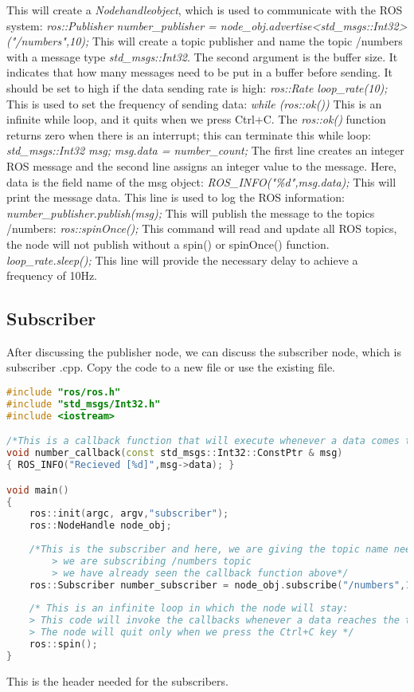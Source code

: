  This will create a \textit{Nodehandleobject}, which is used to communicate with the ROS system:
 \textit{ ros::Publisher number\_publisher = node\_obj.advertise<std\_msgs::Int32>("/numbers",10);} 
 This will create a topic publisher and name the topic /numbers with a message type \textit{std\_msgs::Int32}. The second argument is the buffer size. It indicates that how many messages need to be put in a buffer before sending. It should be set to high if the data sending rate is high: \textit{ros::Rate loop\_rate(10);} This is used to set the frequency of sending data:\textit{ while (ros::ok()) } This is an infinite while loop, and it quits when we press Ctrl+C. The\textit{ ros::ok()} function returns zero when there is an interrupt; this can terminate this while loop:
 \textit{std\_msgs::Int32 msg;} 
 \textit{msg.data = number\_count;} 
 The first line creates an integer ROS message and the second line assigns an integer value to the message.
 Here, data is the field name of the msg object:\textit{ ROS\_INFO("\%d",msg.data);} This will print the message data. This line is used to log the ROS information: \textit{number\_publisher.publish(msg);}
 This will publish the message to the topics /numbers:\textit{ ros::spinOnce();} 
 This command will read and update all ROS topics, the node will not publish without a spin() or spinOnce() function.
 \textit{ loop\_rate.sleep();}
 This line will provide the necessary delay to achieve a frequency of 10Hz.

 
 \subsection{Subscriber}
 
  After discussing the publisher node, we can discuss the subscriber node, which is subscriber .cpp. Copy the code to a new file or use the existing file.
  \begin{lstlisting}[language=C++]
#include "ros/ros.h"
#include "std_msgs/Int32.h"
#include <iostream>

/*This is a callback function that will execute whenever a data comes to the /numbers topic. Whenever a data reaches this topic, the function will call and extract the value and print it to the console.*/
void number_callback(const std_msgs::Int32::ConstPtr & msg) 
{ ROS_INFO("Recieved [%d]",msg->data); }

void main()
{
    ros::init(argc, argv,"subscriber");
    ros::NodeHandle node_obj;
    
    /*This is the subscriber and here, we are giving the topic name needed to subscribe, buffer size, and callback function:
        > we are subscribing /numbers topic
        > we have already seen the callback function above*/
    ros::Subscriber number_subscriber = node_obj.subscribe("/numbers",10,number_callback);
    
    /* This is an infinite loop in which the node will stay: 
    > This code will invoke the callbacks whenever a data reaches the topic. 
    > The node will quit only when we press the Ctrl+C key */
    ros::spin();
}

  \end{lstlisting}
  This is the header needed for the subscribers.

